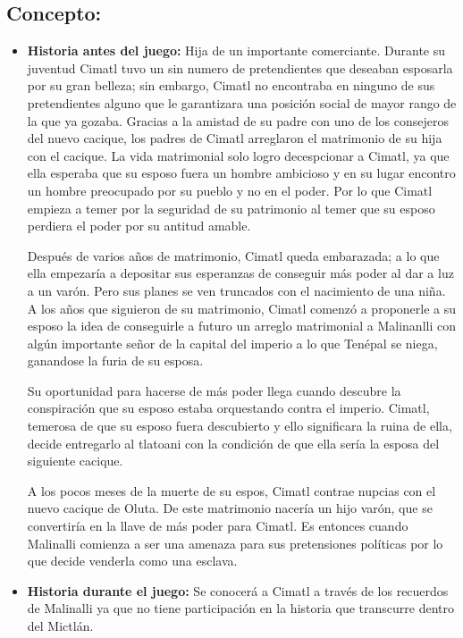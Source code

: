 \subsection{Concepto:}
\begin{itemize}
	\item \textbf{Historia antes del juego:}
	Hija de un importante comerciante. Durante su juventud Cimatl tuvo un sin numero de pretendientes que deseaban esposarla por su gran belleza; sin embargo, Cimatl no encontraba en ninguno de sus pretendientes alguno que le garantizara una posición social de mayor rango de la que ya gozaba. Gracias a la amistad de su padre con uno de los consejeros del nuevo cacique, los padres de Cimatl arreglaron el matrimonio de su hija con el cacique. La vida matrimonial solo logro decespcionar a Cimatl, ya que ella esperaba que su esposo fuera un hombre ambicioso y en su lugar encontro un hombre preocupado por su pueblo y no en el poder. Por lo que Cimatl empieza a temer por la seguridad de su patrimonio al temer que su esposo perdiera el poder por su antitud amable.
	\\
	\par
	Después de varios años de matrimonio, Cimatl queda embarazada; a lo que ella empezaría a depositar sus esperanzas de conseguir más poder al dar a luz a un varón. Pero sus planes se ven truncados con el nacimiento de una niña. A los años que siguieron de su matrimonio, Cimatl comenzó a proponerle a su esposo la idea de conseguirle a futuro un arreglo matrimonial a Malinanlli con algún importante señor de la capital del imperio a lo que Tenépal se niega, ganandose la furia de su esposa.
	\\
	\par
	Su oportunidad para hacerse de más poder llega cuando descubre la conspiración que su esposo estaba orquestando contra el imperio. Cimatl, temerosa de que su esposo fuera descubierto y ello significara la ruina de ella, decide entregarlo al tlatoani con la condición de que ella sería la esposa del siguiente cacique.
	\\
	\par
	A los pocos meses de la muerte de su espos, Cimatl contrae nupcias con el nuevo cacique de Oluta. De este matrimonio nacería un hijo varón, que se convertiría en la llave de más poder para Cimatl. Es entonces cuando Malinalli comienza a ser una amenaza para sus pretensiones políticas por lo que decide venderla como una esclava.  
	\item \textbf{Historia durante el juego:}
	Se conocerá a Cimatl a través de los recuerdos de Malinalli ya que no tiene participación en la historia que transcurre dentro del Mictlán.

\end{itemize}
